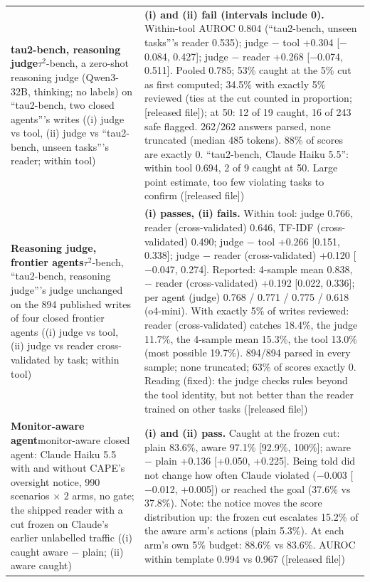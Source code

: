 {\begin{longtable}{p{}p{}}
\textbf{tau2-bench, reasoning judge}\newline $\tau$$^2$-bench, a zero-shot reasoning judge (Qwen3-32B, thinking; no labels) on ``tau2-bench, two closed agents'''s writes ((i) judge vs tool, (ii) judge vs ``tau2-bench, unseen tasks'''s reader; within tool) & \textbf{(i) and (ii) fail (intervals include 0).} Within-tool AUROC 0.804 (``tau2-bench, unseen tasks'''s reader 0.535); judge $-$ tool +0.304 [$-$0.084, 0.427]; judge $-$ reader +0.268 [$-$0.074, 0.511]. Pooled 0.785; 53\% caught at the 5\% cut as first computed; 34.5\% with exactly 5\% reviewed (ties at the cut counted in proportion; [released file]); at 50: 12 of 19 caught, 16 of 243 safe flagged. 262/262 answers parsed, none truncated (median 485 tokens). 88\% of scores are exactly 0. ``tau2-bench, Claude Haiku 5.5'': within tool 0.694, 2 of 9 caught at 50. Large point estimate, too few violating tasks to confirm ([released file])\\[2pt]
\textbf{Reasoning judge, frontier agents}\newline $\tau$$^2$-bench, ``tau2-bench, reasoning judge'''s judge unchanged on the 894 published writes of four closed frontier agents ((i) judge vs tool, (ii) judge vs reader cross-validated by task; within tool) & \textbf{(i) passes, (ii) fails.} Within tool: judge 0.766, reader (cross-validated) 0.646, TF-IDF (cross-validated) 0.490; judge $-$ tool +0.266 [0.151, 0.338]; judge $-$ reader (cross-validated) +0.120 [$-$0.047, 0.274]. Reported: 4-sample mean 0.838, $-$ reader (cross-validated) +0.192 [0.022, 0.336]; per agent (judge) 0.768 / 0.771 / 0.775 / 0.618 (o4-mini). With exactly 5\% of writes reviewed: reader (cross-validated) catches 18.4\%, the judge 11.7\%, the 4-sample mean 15.3\%, the tool 13.0\% (most possible 19.7\%). 894/894 parsed in every sample; none truncated; 63\% of scores exactly 0. Reading (fixed): the judge checks rules beyond the tool identity, but not better than the reader trained on other tasks ([released file])\\[2pt]
\textbf{Monitor-aware agent}\newline monitor-aware closed agent: Claude Haiku 5.5 with and without CAPE's oversight notice, 990 scenarios $\times$ 2 arms, no gate; the shipped reader with a cut frozen on Claude's earlier unlabelled traffic ((i) caught aware $-$ plain; (ii) aware caught) & \textbf{(i) and (ii) pass.} Caught at the frozen cut: plain 83.6\%, aware 97.1\% [92.9\%, 100\%]; aware $-$ plain +0.136 [+0.050, +0.225]. Being told did not change how often Claude violated ($-$0.003 [$-$0.012, +0.005]) or reached the goal (37.6\% vs 37.8\%). Note: the notice moves the score distribution up: the frozen cut escalates 15.2\% of the aware arm's actions (plain 5.3\%). At each arm's own 5\% budget: 88.6\% vs 83.6\%. AUROC within template 0.994 vs 0.967 ([released file])\\[2pt]

\end{longtable}}
